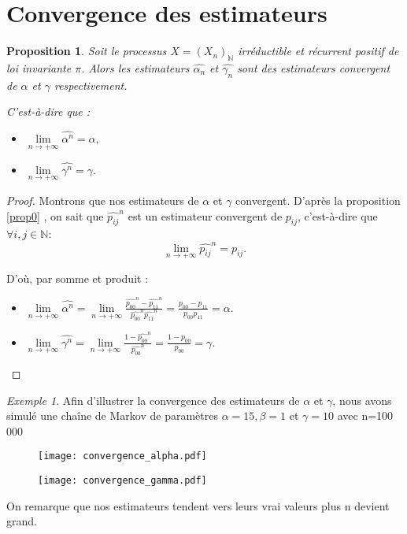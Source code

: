 \documentclass[12pt,a4paper]{report}
\newtheorem{prop}[thm]{Proposition}
\theoremstyle{remark}
\newtheorem*{example}{Exemple}
\begin{document}
\section{Convergence des estimateurs}

\vspace{0.6cm}
\begin{prop}\label{prop_conv}
Soit le processus $X=(X_n)_{\mathbb{N}}$ irréductible et récurrent positif de loi invariante $\pi$. Alors les estimateurs $\hat{\alpha_n}$ et $\hat{\gamma_n}$ sont des estimateurs convergent de $\alpha$ et $\gamma$ respectivement.

C'est-à-dire que : 
\begin{itemize}
    \item $\lim\limits_{n \to +\infty}\hat{\alpha^n} =\alpha, $\\
    \item $\lim\limits_{n \to +\infty}\hat{\gamma^n} =\gamma. $
\end{itemize}
\end{prop}

\begin{proof}
Montrons que nos estimateurs de $\alpha$ et $\gamma$ convergent.
D'après la proposition \ref{prop0} , on sait que $\hat{p_{ij}}^n$ est un estimateur convergent de $p_{ij}$, c'est-à-dire que $\forall i,j \in \mathbb{N}$: 
$$\lim\limits_{n \to +\infty}\hat{p_{ij}}^n = p_{ij}.$$ 

D'où, par somme et produit : \\
\begin{itemize}
    \item $\lim\limits_{n \to +\infty}\hat{\alpha^n} =\lim\limits_{n \to +\infty}\frac{\hat{p_{00}}^n-\hat{p_{11}}^n}{\hat{p_{00}}^n\hat{p_{11}}^n} = \frac{p_{00}-p_{11}}{p_{00}p_{11}} = \alpha .$\\
    \item $\lim\limits_{n \to +\infty}\hat{\gamma^n} = \lim\limits_{n \to +\infty}\frac{1-\hat{p_{00}}^n}{\hat{p_{00}}^n} =\frac{1-p_{00}}{p_{00}}= \gamma .$
\end{itemize}
\end{proof}

\begin{example}\label{exemple_convergence}
Afin d'illustrer la convergence des estimateurs de $\alpha$ et $\gamma$, nous avons simulé une chaîne de Markov de paramètres $\alpha =15, \beta = 1$ et $\gamma =10$ avec n=100 000

\begin{figure}[h]
 \begin{minipage}[c]{0.25\linewidth}
        \centering
        \texttt{[image: convergence\_alpha.pdf]}
    \end{minipage}
    \hfill%
    \vspace{0.1cm}
    \begin{minipage}[c]{0.50\linewidth}
        \centering
       \texttt{[image: convergence\_gamma.pdf]}
    \end{minipage}
\end{figure}

On remarque que nos estimateurs tendent vers leurs vrai valeurs plus n devient grand.
\end{example}
\end{document}
